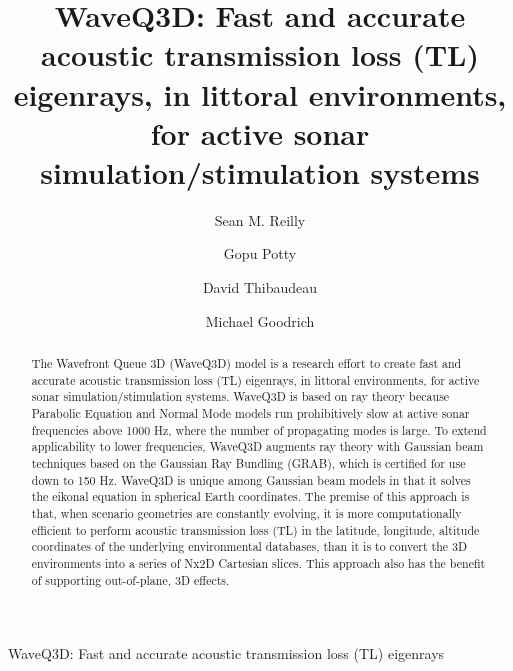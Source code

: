 \documentclass{ws-jca}
\newcommand{\threeD}{3\nobreakdash\textendash D }	%
\newcommand{\twoDxN}{Nx2\nobreakdash\textendash D }
\begin{document}
{WaveQ3D: Fast and accurate acoustic transmission loss (TL) eigenrays}

%
\catchline{}{}{}{}{}
%

\title{WaveQ3D: Fast and accurate acoustic transmission loss (TL) eigenrays, in littoral environments, for active sonar simulation/stimulation systems}

\author{Sean M. Reilly}
\address{Department of Ocean Engineering, University of Rhode Island,\\
Narragansett RI, USA\\
 }

\author{Gopu Potty}
\address{Department of Ocean Engineering, University of Rhode Island,\\
Narragansett RI, USA\\
 }

\author{David Thibaudeau}
\address{AEgis Technologies Group, Inc.,\\
North Kingstown RI, USA\\
 }

\author{Michael Goodrich}
\address{Alion Science and Technology Corporation,\\
Norfolk VA, USA\\
 }

\maketitle

\begin{history}
\end{history}

\begin{abstract}
The Wavefront Queue \threeD (WaveQ3D) model is a research effort to create fast and accurate acoustic transmission loss (TL) eigenrays, in littoral environments, for active sonar simulation/stimulation systems.  WaveQ3D is based on ray theory because Parabolic Equation and Normal Mode models run prohibitively slow at active sonar frequencies above 1000 Hz, where the number of propagating modes is large.  To extend applicability to lower frequencies, WaveQ3D augments ray theory with Gaussian beam techniques based on the Gaussian Ray Bundling (GRAB), which is certified for use down to 150 Hz. WaveQ3D is unique among Gaussian beam models in that it solves the eikonal equation in spherical Earth coordinates. The premise of this approach is that, when scenario geometries are constantly evolving, it is more computationally efficient to perform acoustic transmission loss (TL) in the latitude, longitude, altitude coordinates of the underlying environmental databases, than it is to convert the \threeD environments into a series of \twoDxN Cartesian slices.  This approach also has the benefit of supporting out-of-plane, \threeD effects. 
\end{abstract}
\end{document}
